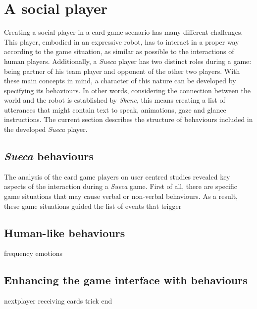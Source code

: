 \section{A social player}
\label{chapter:social-player}

Creating a social player in a card game scenario has many different challenges.
This player, embodied in an expressive robot, has to interact in a proper way according to the game situation, as similar as possible to the interactions of human players.
Additionally, a \emph{Sueca} player has two distinct roles during a game: being partner of his team player and opponent of the other two players.
With these main concepts in mind, a character of this nature can be developed by specifying its behaviours.
In other words, considering the connection between the world and the robot is established by \emph{Skene}, this means creating a list of utterances that might contain text to speak, animations, gaze and glance instructions.
The current section describes the structure of behaviours included in the developed \emph{Sueca} player.


\subsection{\emph{Sueca} behaviours}
The analysis of the card game players on user centred studies revealed key aspects of the interaction during a \emph{Sueca} game.
First of all, there are specific game situations that may cause verbal or non-verbal behaviours.
As a result, these game situations guided the list of events that trigger


\subsection{Human-like behaviours}
frequency
emotions

\subsection{Enhancing the game interface with behaviours}
nextplayer
receiving cards
trick end